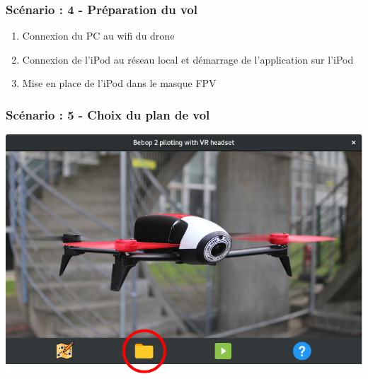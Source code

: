 \documentclass{beamer}
\begin{document}


	\begin{frame}
		\begin{center}
		\frametitle{Scénario : 4 - Préparation du vol}
        \begin{enumerate}
		    \item Connexion du PC au wifi du drone
		    \item Connexion de l'iPod au réseau local et démarrage de l'application sur l'iPod
		    \item Mise en place de l'iPod dans le masque FPV
		\end{enumerate}
		
		\end{center}
	\end{frame}
	


	\begin{frame}
		\begin{center}
		\frametitle{Scénario : 5 - Choix du plan de vol}

        \includegraphics[scale=0.4]{chooseFile.png}
		\end{center}
	\end{frame}
	
\end{document}
